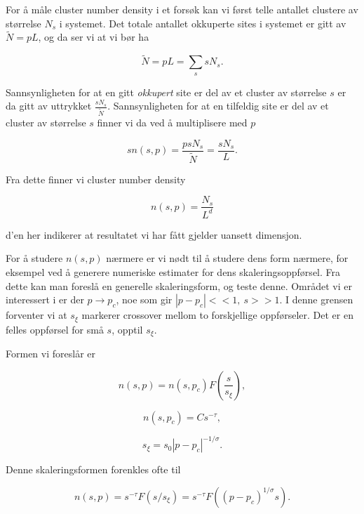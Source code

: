 \documentclass[a4paper,10pt]{article}
\begin{document}
For å måle cluster number density i et forsøk kan vi først telle antallet clustere av størrelse $N_s$ i systemet. Det totale antallet okkuperte sites i systemet er gitt av $\tilde{N} = pL$, og da ser vi at vi bør ha 

\begin{equation}
 \tilde{N} = pL = \sum_ssN_s.
\end{equation}

Sannsynligheten for at en gitt \textit{okkupert} site er del av et cluster av størrelse $s$ er da gitt av uttrykket $\frac{sN_s}{\tilde{N}}$. Sannsynligheten for at en tilfeldig site er del av et cluster av størrelse $s$ finner vi da ved å multiplisere med $p$

\begin{equation}
 sn(s,p) = \frac{psN_s}{\tilde{N}} = \frac{sN_s}{L}.
\end{equation}

Fra dette finner vi cluster number density

\begin{equation}
 n(s,p) = \frac{N_s}{L^d}
\end{equation}

d'en her indikerer at resultatet vi har fått gjelder uansett dimensjon. 

For å studere $n(s,p)$ nærmere er vi nødt til å studere dens form nærmere, for eksempel ved å generere numeriske estimater for dens skaleringsoppførsel. Fra dette kan man foreslå en generelle skaleringsform, og teste denne. Området vi er interessert i er der $p\rightarrow p_c$, noe som gir $|p-p_c|<<1,\ s>>1$. I denne grensen forventer vi at $s_{\xi}$ markerer crossover mellom to forskjellige oppførseler. Det er en felles oppførsel for små $s$, opptil $s_{\xi}$. 

Formen vi foreslår er

\begin{equation}
n(s,p) = n(s,p_c)F(\frac{s}{s_{\xi}}),
\end{equation}

\begin{equation}
 n(s,p_c) = Cs^{-\tau},
\end{equation}

\begin{equation} %
 s_{\xi} = s_0|p-p_c|^{-1/\sigma}. 
\end{equation}

Denne skaleringsformen forenkles ofte til

\begin{equation}
 n(s,p) = s^{-\tau}F(s/s_{\xi}) = s^{-\tau}F((p-p_c)^{1/\sigma}s).
\end{equation}
\end{document}

